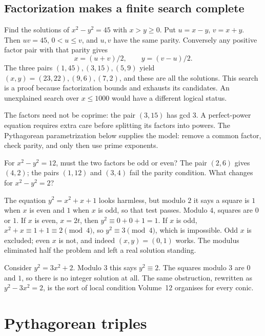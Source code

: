 \subsection*{Factorization makes a finite search complete}
Find the solutions of $x^2-y^2=45$ with $x>y\ge0$. Put
$u=x-y$, $v=x+y$. Then $uv=45$, $0<u\le v$, and $u,v$ have the same parity.
Conversely any positive factor pair with that parity gives
\[
x=(u+v)/2,\qquad y=(v-u)/2.
\]
The three pairs $(1,45),(3,15),(5,9)$ yield
$(x,y)=(23,22),(9,6),(7,2)$, and these are all the solutions.
This search is a proof because factorization bounds and exhausts its candidates.
An unexplained search over $x\le1000$ would have a different logical status.

The factors need not be coprime: the pair $(3,15)$ has gcd $3$.
A perfect-power equation requires extra care before splitting its factors
into powers. The Pythagorean parametrization below supplies the model:
remove a common factor, check parity, and only then use prime exponents.

\begin{think}
For $x^2-y^2=12$, must the two factors be odd or even?
The pair $(2,6)$ gives $(4,2)$; the pairs $(1,12)$ and $(3,4)$ fail the
parity condition. What changes for $x^2-y^2=2$?
\end{think}

\begin{examplex}
The equation $y^2=x^2+x+1$ looks harmless, but modulo $2$ it says a square is $1$ when $x$ is even and $1$ when $x$ is odd, so that test passes. Modulo $4$, squares are $0$ or $1$. If $x$ is even, $x=2t$, then $y^2\equiv 0+0+1=1$. If $x$ is odd, $x^2+x\equiv 1+1\equiv 2\pmod 4$, so $y^2\equiv 3\pmod 4$, which is impossible. Odd $x$ is excluded; even $x$ is not, and indeed $(x,y)=(0,1)$ works. The modulus eliminated half the problem and left a real solution standing.
\end{examplex}

\begin{examplex}
Consider $y^2=3x^2+2$. Modulo $3$ this says $y^2\equiv 2$. The squares modulo $3$ are $0$ and $1$, so there is no integer solution at all. The same obstruction, rewritten as $y^2-3x^2=2$, is the sort of local condition Volume~12 organises for every conic.
\end{examplex}

\section{Pythagorean triples}

